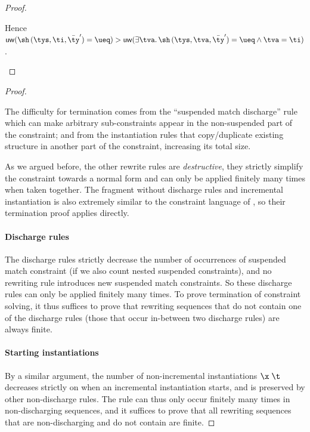 \documentclass[acmsmall,screen,nonacm%
\Anonymous{,anonymous}{}%
\Final{}{,review}%
]{acmart}
\newcommand{\BBemlti}{Pottier-Remy/emlti}
\begin{document}
\begin{lemma}
\begin{proof}
\begin{proofcases}
	Hence $\uw {\cunif {\pshapp \parens{\tys, \ti, \typs}} \ueq } > \uw {\cexists \tv {\cunif {\pshapp \parens{\tys, \tv, \typs}} \ueq \cand \cunif \tv \ti}}$.
    \end{proofcases}
  \end{proof}
\end{lemma}

\terminationBIS*
\begin{proof}
\begin{local}\sloppy
  The difficulty for termination comes from the ``suspended match discharge'' rule
   which can make arbitrary
  sub-constraints appear in the non-suspended part of the constraint;
  and from the instantiation rules that copy/duplicate existing
  structure in another part of the constraint, increasing its total
  size.

\end{local}
  As we argued before, the other rewrite rules are \emph{destructive},
  they strictly simplify the constraint towards a normal form and can
  only be applied finitely many times when taken together. The
  fragment without discharge rules and incremental instantiation is
  also extremely similar to the constraint language of
  \citet*{\BBemlti}, so their termination proof applies
  directly.

  \paragraph{Discharge rules} The discharge rules strictly decrease
  the number of occurrences of suspended match constraint (if we also
  count nested suspended constraints), and no rewriting rule
  introduces new suspended match constraints. So these discharge rules
  can only be applied finitely many times. To prove termination of
  constraint solving, it thus suffices to prove that rewriting
  sequences that do not contain one of the discharge rules (those that
  occur in-between two discharge rules) are always finite.

  \paragraph{Starting instantiations} By a similar argument, the number
  of non-incremental instantiations $\capp \x \t$ decreases strictly on
   when an incremental instantiation starts, and is
  preserved by other non-discharge rules. The rule 
  can thus only occur finitely many times in non-discharging sequences,
  and it suffices to prove that all rewriting sequences that are
  non-discharging and do not contain  are finite.


\end{proof}
\end{document}
